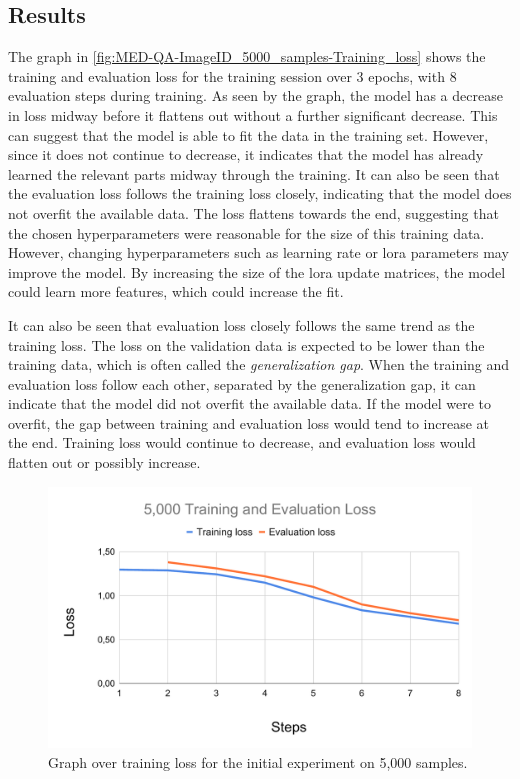     \subsection{Results}


    The graph in \autoref{fig:MED-QA-ImageID_5000_samples-Training_loss} shows the training and evaluation loss for the training session over 3 epochs, with 8 evaluation steps during training. As seen by the graph, the model has a decrease in loss midway before it flattens out without a further significant decrease. This can suggest that the model is able to fit the data in the training set. However, since it does not continue to decrease, it indicates that the model has already learned the relevant parts midway through the training. It can also be seen that the evaluation loss follows the training loss closely, indicating that the model does not overfit the available data. The loss flattens towards the end, suggesting that the chosen hyperparameters were reasonable for the size of this training data. 
    However, changing hyperparameters such as learning rate or \gls{lora} parameters may improve the model. By increasing the size of the \gls{lora} update matrices, the model could learn more features, which could increase the fit.

    It can also be seen that evaluation loss closely follows the same trend as the training loss. The loss on the validation data is expected to be lower than the training data, which is often called the \textit{generalization gap}. When the training and evaluation loss follow each other, separated by the generalization gap, it can indicate that the model did not overfit the available data. If the model were to overfit, the gap between training and evaluation loss would tend to increase at the end. Training loss would continue to decrease, and evaluation loss would flatten out or possibly increase. 

    
    \begin{figure}[htb]
        \centering
        \includegraphics[width=\linewidth]{images/MED-QA-ImageID_5000_samples-Training_loss}
        \caption[Graph over training loss for the initial experiment.]{Graph over training loss for the initial experiment on 5,000 samples.}
        \label{fig:MED-QA-ImageID_5000_samples-Training_loss}
    \end{figure} 

